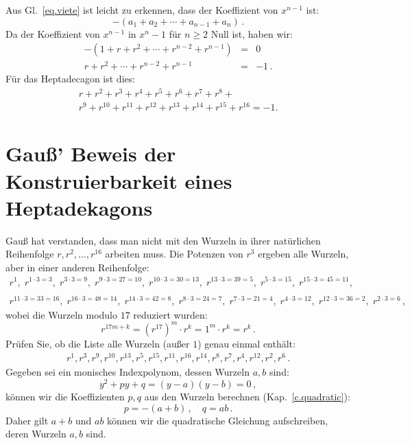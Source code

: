 Aus Gl.~\ref{eq.viete} ist leicht zu erkennen, dass der Koeffizient von $x^{n-1}$ ist:
\[
-(a_1+a_2+\cdots+a_{n-1}+a_n)\,.
\]
Da der Koeffizient von $x^{n-1}$ in $x^n-1$ für $n\geq 2$ Null ist, haben wir:
\begin{eqnarray*}
-(1+r+r^2+\cdots + r^{n-2}+r^{n-1})&=&0\\
r+r^2+\cdots + r^{n-2}+r^{n-1}&=&-1\,.
\end{eqnarray*}
Für das Heptadecagon ist dies:
\begin{multline}
r+r^2+r^3+r^4+r^5+r^6+r^7+r^8+\\
r^9+r^{10}+r^{11}+r^{12}+r^{13}+r^{14} + r^{15}+r^{16}=-1.\label{eq.minus-one}
\end{multline}

\section{Gauß' Beweis der Konstruierbarkeit eines Heptadekagons}\label{s.gauss}

Gauß hat verstanden, dass man nicht mit den Wurzeln in ihrer natürlichen Reihenfolge $r,r^2,\ldots,r^{16}$ arbeiten muss. Die Potenzen von $r^3$ ergeben alle Wurzeln, aber in einer anderen Reihenfolge:
\[
\begin{array}{l}
r^1, \;r^{1\cdot 3 =3},\; r^{3\cdot 3=9},\; r^{9\cdot 3=27=10},\; r^{10\cdot 3=30=13},\; r^{13\cdot 3=39=5},\; r^{5\cdot 3=15},\; r^{15\cdot 3=45=11},\\\\
r^{11\cdot 3 =33=16}, \;r^{16\cdot 3=48=14},\; r^{14\cdot 3=42=8},\; r^{8\cdot 3=24=7},\;r^{7\cdot 3=21=4},\; r^{4\cdot 3=12},\; r^{12\cdot 3=36=2},\; r^{2\cdot 3=6}\,,
\end{array}
\]
wobei die Wurzeln modulo $17$ reduziert wurden:
\[
r^{17m+k}=(r^{17})^m\cdot r^k=1^m\cdot r^k=r^k\,.
\]
Prüfen Sie, ob die Liste alle Wurzeln (außer $1$) genau einmal enthält:
\begin{align}\label{eq.roots}
r^1, r^3, r^9, r^{10}, r^{13}, r^5, r^{15}, r^{11}, r^{16}, r^{14}, r^8, r^7, r^4, r^{12}, r^2, r^6\,.
\end{align}
Gegeben sei ein monisches Indexpolynom, dessen Wurzeln $a,b$ sind:
\[
y^2+py+q=(y-a)(y-b)=0\,,
\]
können wir die Koeffizienten $p,q$ aus den Wurzeln berechnen (Kap.~\ref{c.quadratic}):
\[
p=-(a+b)\,,\quad q=ab\,.
\]
Daher gilt $a+b$ und $ab$ können wir die quadratische Gleichung aufschreiben, deren Wurzeln $a,b$ sind.

